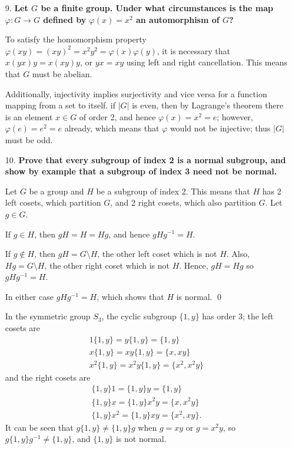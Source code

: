 \documentclass[a4paper,12pt]{article}
\begin{document}
\begin{enumerate}
    \item[9.]
        \boldmath
        \textbf{Let $G$ be a finite group. Under what circumstances is the map $\varphi : G \to G$ defined by $\varphi(x) = x^2$ an automorphism of $G$?} \par
        \unboldmath
        To satisfy the homomorphism property $\varphi(xy) = (xy)^2 = x^2 y^2 = \varphi(x) \varphi(y)$, it is necessary that $x(yx)y = x(xy)y$, or $yx = xy$ using left and right cancellation. This means that $G$ must be abelian. \par
        Additionally, injectivity implies surjectivity and vice versa for a function mapping from a set to itself. if $|G|$ is even, then by Lagrange's theorem there is an element $x \in G$ of order 2, and hence $\varphi(x) = x^2 = e$; however, $\varphi(e) = e^2 = e$ already, which means that $\varphi$ would not be injective; thus $|G|$ must be odd.

    \item[10.]
        \boldmath
        \textbf{Prove that every subgroup of index 2 is a normal subgroup, and show by example that a subgroup of index 3 need not be normal.} \par
        \unboldmath
        Let $G$ be a group and $H$ be a subgroup of index 2. This means that $H$ has 2 left cosets, which partition $G$, and 2 right cosets, which also partition $G$. Let $g \in G$. \par
        If $g \in H$, then $gH = H = Hg$, and hence $gHg^{-1} = H$. \par
        If $g \notin H$, then $gH = G \setminus H$, the other left coset which is not $H$. Also, $Hg = G \setminus H$, the other right coset which is not $H$. Hence, $gH = Hg$ so $gHg^{-1} = H$. \par
        In either case $gHg^{-1} = H$, which shows that $H$ is normal. \qed \par
        In the symmetric group $S_3$, the cyclic subgroup $\{ 1, y \}$ has order 3; the left cosets are
        \begin{gather*}
            1\{ 1, y \} = y\{ 1, y \} = \{ 1, y \} \\
            x\{ 1, y \} = xy\{ 1, y \} = \{ x, xy \} \\
            x^2\{ 1, y \} = x^2y\{ 1, y \} = \{ x^2, x^2y \}
        \end{gather*}
        and the right cosets are
        \begin{gather*}
            \{ 1, y \}1 = \{ 1, y \}y = \{ 1, y \} \\
            \{ 1, y \}x = \{ 1, y \}x^2y = \{ x, x^2y \} \\
            \{ 1, y \}x^2 = \{ 1, y \}xy = \{ x^2, xy \}.
        \end{gather*}
        It can be seen that $g \{ 1, y \} \neq \{ 1, y \} g$ when $g = xy$ or $g = x^2y$, so $g \{ 1, y \} g^{-1} \neq \{ 1, y \}$, and $\{ 1, y \}$ is not normal.


\end{enumerate}
\end{document}
